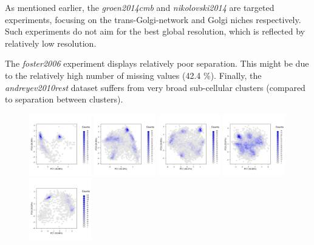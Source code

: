 \documentclass[12pt]{article}\usepackage[]{graphicx}\usepackage[]{color}
\begin{document}
As mentioned earlier, the \textit{groen2014cmb} and
\textit{nikolovski2014} are targeted experiments, focusing on the
trans-Golgi-network and Golgi niches respectively. Such experiments do
not aim for the best global resolution, which is reflected by relatively
low resolution.

The \textit{foster2006} experiment displays relatively poor
separation. This might be due to the relatively high number of missing
values (42.4 \%). Finally, the \textit{andreyev2010rest} dataset suffers from
very broad sub-cellular clusters (compared to separation between
clusters).




\begin{figure}[p]
  \centering
  \includegraphics[width = 0.24\textwidth]{./figure/fighexpca-1.pdf}
  \includegraphics[width = 0.24\textwidth]{./figure/fighexpca-2.pdf}
  \includegraphics[width = 0.24\textwidth]{./figure/fighexpca-3.pdf}
  \includegraphics[width = 0.24\textwidth]{./figure/fighexpca-4.pdf}
  \includegraphics[width = 0.24\textwidth]{./figure/fighexpca-5.pdf}

\end{figure}
\end{document}
